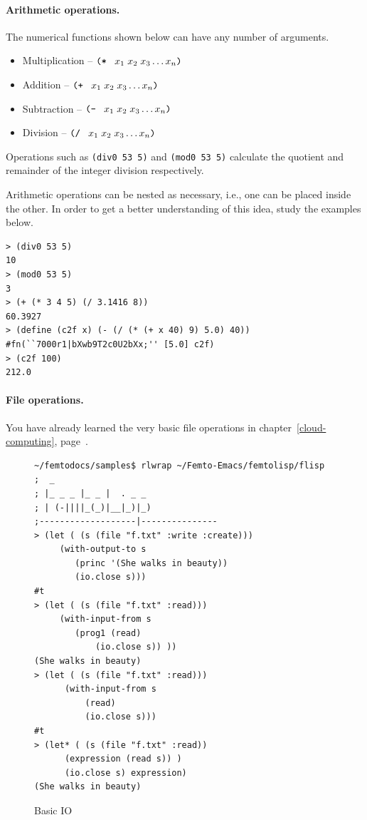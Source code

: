 \documentclass[a4paper,12pt]{book}
\newenvironment{fmpage}[1]
           {\begin{lrbox}{\fmbox}\begin{minipage}{#1}}
           {\end{minipage}\end{lrbox}\fbox{\usebox{\fmbox}}}
\begin{document}
\paragraph{Arithmetic operations.} The numerical functions
shown below can have any number of arguments.
\begin{itemize}
\item Multiplication -- $\verb|(* |\;x_1\; x_2\; x_3\ldots x_n\verb|)|$
\item Addition -- $\verb|(+ |\;x_1\; x_2\; x_3\ldots x_n\verb|)|$
\item Subtraction -- $\verb|(- |\;x_1\; x_2\; x_3\ldots x_n\verb|)|$
\item Division -- $\verb|(/ |\;x_1\; x_2\; x_3\ldots x_n\verb|)|$
\end{itemize}
Operations such as \verb|(div0 53 5)| and \verb|(mod0 53 5)|
calculate the quotient and remainder of the integer
division respectively. 

Arithmetic operations can
be nested as necessary, i.e., one
 can be placed inside the other.
In order to get a better understanding
of this idea, study the examples below.
\begin{Verbatim}[fontsize=\small,
frame=single]
> (div0 53 5)
10
> (mod0 53 5)
3
> (+ (* 3 4 5) (/ 3.1416 8))
60.3927
> (define (c2f x) (- (/ (* (+ x 40) 9) 5.0) 40))
#fn(``7000r1|bXwb9T2c0U2bXx;'' [5.0] c2f)
> (c2f 100)
212.0
\end{Verbatim}

\paragraph{File operations.}
You have already learned the very basic
file operations in chapter~\ref{cloud-computing},
page~\pageref{cloud-computing}.\\


\begin{figure}[!h]
\begin{fmpage}{0.95\textwidth}
\begin{verbatim}
~/femtodocs/samples$ rlwrap ~/Femto-Emacs/femtolisp/flisp
;  _
; |_ _ _ |_ _ |  . _ _
; | (-||||_(_)|__|_)|_)
;-------------------|---------------
> (let ( (s (file "f.txt" :write :create)))
     (with-output-to s
        (princ '(She walks in beauty))
        (io.close s)))
#t
> (let ( (s (file "f.txt" :read)))
     (with-input-from s
        (prog1 (read)
            (io.close s)) ))
(She walks in beauty)
> (let ( (s (file "f.txt" :read)))
      (with-input-from s
          (read)
          (io.close s)))
#t
> (let* ( (s (file "f.txt" :read))
      (expression (read s)) )
      (io.close s) expression)
(She walks in beauty)
\end{verbatim}
\end{fmpage}
\caption{Basic IO}
\label{basicio}
\end{figure}
\end{document}
